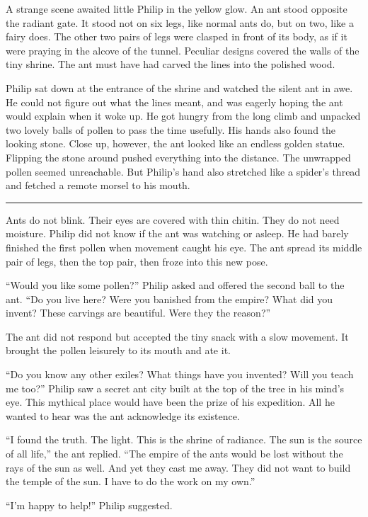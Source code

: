 \documentclass[10pt, draft]{memoir}
\renewcommand{\pfbreakdisplay}{\bigskip \ding{166} \bigskip}
\newcommand{\secbreak}{\fancybreak{\pfbreakdisplay}}
\begin{document}
A strange scene awaited little Philip in the yellow glow. An ant stood opposite the radiant gate. It stood not on six legs, like normal ants do, but on two, like a fairy does. The other two pairs of legs were clasped in front of its body, as if it were praying in the alcove of the tunnel. Peculiar designs covered the walls of the tiny shrine. The ant must have had carved the lines into the polished wood.

Philip sat down at the entrance of the shrine and watched the silent ant in awe. He could not figure out what the lines meant, and was eagerly hoping the ant would explain when it woke up. He got hungry from the long climb and unpacked two lovely balls of pollen to pass the time usefully. His hands also found the looking stone. Close up, however, the ant looked like an endless golden statue. Flipping the stone around pushed everything into the distance. The unwrapped pollen seemed unreachable. But Philip's hand also stretched like a spider's thread and fetched a remote morsel to his mouth.

\secbreak

Ants do not blink. Their eyes are covered with thin chitin. They do not need moisture. Philip did not know if the ant was watching or asleep. He had barely finished the first pollen when movement caught his eye. The ant spread its middle pair of legs, then the top pair, then froze into this new pose.

``Would you like some pollen?'' Philip asked and offered the second ball to the ant. ``Do you live here? Were you banished from the empire? What did you invent? These carvings are beautiful. Were they the reason?''

The ant did not respond but accepted the tiny snack with a slow movement. It brought the pollen leisurely to its mouth and ate it.

``Do you know any other exiles? What things have you invented? Will you teach me too?'' Philip saw a secret ant city built at the top of the tree in his mind's eye. This mythical place would have been the prize of his expedition. All he wanted to hear was the ant acknowledge its existence.

``I found the truth. The light. This is the shrine of radiance. The sun is the source of all life,'' the ant replied. ``The empire of the ants would be lost without the rays of the sun as well. And yet they cast me away. They did not want to build the temple of the sun. I have to do the work on my own.''

``I'm happy to help!'' Philip suggested.
\end{document}
